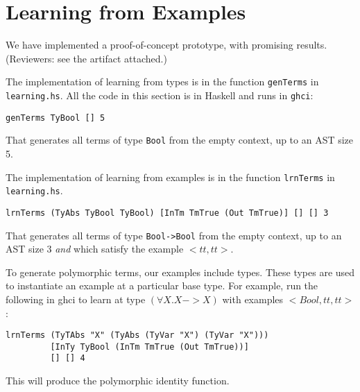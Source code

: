 \documentclass[acmsmall]{acmart}
\theoremstyle{mytheoremstyle}
\begin{document}
\section{Learning from Examples}


We have implemented a proof-of-concept prototype, with promising results.
(Reviewers: see the artifact attached.)



The implementation of learning from types is in the function {\tt genTerms} in {\tt learning.hs}. All the code in this section is in Haskell and runs in {\tt ghci}:
\begin{verbatim}
genTerms TyBool [] 5
\end{verbatim}

That generates all terms of type {\tt Bool} from the empty context, up to an AST size 5.

The implementation of learning from examples is in the function {\tt lrnTerms} in {\tt learning.hs}.
\begin{verbatim}
lrnTerms (TyAbs TyBool TyBool) [InTm TmTrue (Out TmTrue)] [] [] 3
\end{verbatim}

That generates all terms of type {\tt Bool->Bool} from the empty context, up to an AST size 3 \emph{and} which satisfy the example $<tt,tt>$. 

To generate polymorphic terms, our examples include types. These types are used to instantiate an example at a particular base type. For example, run the following in ghci to learn at type $(\forall X.X->X)$ with examples $<Bool,tt,tt>$:
\begin{verbatim}
lrnTerms (TyTAbs "X" (TyAbs (TyVar "X") (TyVar "X")))
         [InTy TyBool (InTm TmTrue (Out TmTrue))]
         [] [] 4
\end{verbatim}
This will produce the polymorphic identity function.
\end{document}
